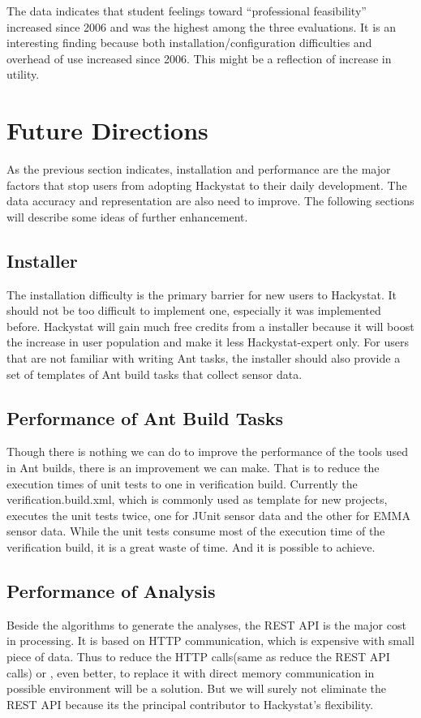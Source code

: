 \documentclass[11pt]{article}
\begin{document}
The data indicates that student feelings toward ``professional feasibility'' increased since 2006 and was the highest among the three evaluations. It is an interesting finding because both installation/configuration difficulties and overhead of use increased since 2006. This might be a reflection of increase in utility.

\section{Future Directions}
As the previous section indicates, installation and performance are the major factors that stop users from adopting Hackystat to their daily development. The data accuracy and representation are also need to improve. The following sections will describe some ideas of further enhancement.

\subsection{Installer} 
The installation difficulty is the primary barrier for new users to Hackystat. It should not be too difficult to implement one, especially it was implemented before. Hackystat will gain much free credits from a installer because it will boost the increase in user population and make it less Hackystat-expert only. For users that are not familiar with writing Ant tasks, the installer should also provide a set of templates of Ant build tasks that collect sensor data.

\subsection{Performance of Ant Build Tasks} 
Though there is nothing we can do to improve the performance of the tools used in Ant builds, there is an improvement we can make. That is to reduce the execution times of unit tests to one in verification build. Currently the verification.build.xml, which is commonly used as template for new projects, executes the unit tests twice, one for JUnit sensor data and the other for EMMA sensor data. While the unit tests consume most of the execution time of the verification build, it is a great waste of time. And it is possible to achieve.

\subsection{Performance of Analysis} 
Beside the algorithms to generate the analyses, the REST API is the major cost in processing. It is based on HTTP communication, which is expensive with small piece of data. Thus to reduce the HTTP calls(same as reduce the REST API calls) or , even better, to replace it with direct memory communication in possible environment will be a solution. But we will surely not eliminate the REST API because its the principal contributor to Hackystat's flexibility.
\end{document}
